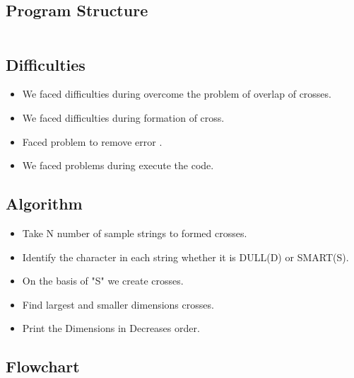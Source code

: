 \documentclass[12pt]{article}
\begin{document}
\subsection{Program Structure}
\begin{lstlisting}

\end{lstlisting}


\subsection{Difficulties}
\begin{itemize}
\item We faced difficulties during overcome the problem of overlap of crosses. 
\item We faced difficulties during formation of cross.
\item Faced problem to remove error .
\item We faced problems during execute the code.

\end{itemize}
\subsection{Algorithm}
\begin{itemize}
\item Take N number of sample   strings to formed crosses.
\item Identify the character in each string whether it is DULL(D) or SMART(S).
\item On the basis  of "S" we create crosses.
\item Find largest and smaller dimensions crosses.
\item Print the Dimensions in Decreases order.

\end{itemize}




\subsection{Flowchart}
\end{document}
